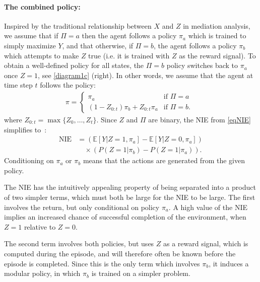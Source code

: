 \documentclass[letterpaper]{article} %
\newcommand{\EE}{\mathbb{E}}
\newcommand{\NIE}{\textrm{NIE}\xspace}
\begin{document}
	\paragraph{The combined policy:}
	Inspired by the traditional relationship between $X$ and $Z$ in mediation analysis, we assume that if $\Pi = a$ then the agent follows a policy $\pi_a$ which is trained to simply maximize $Y$, and that otherwise, if $\Pi = b$, the agent follows a policy $\pi_b$ which attempts to make $Z$ true (i.e. it is trained with $Z$ as the reward signal). To obtain a well-defined policy for all states, the $\Pi=b$ policy switches back to $\pi_a$ once $Z=1$, see \cref{diagram1c} (right). In other words, we assume that the agent at time step $t$ follows the policy:
	\begin{align}
		\pi = \begin{cases} \pi_a & \mbox{if $\Pi = a$ } \\ \left(1-Z_{0:t} \right)\pi_b +Z_{0:t} \pi_a
			& \mbox{if $\Pi = b$. }\end{cases} \label{eq10}
	\end{align}
	where $Z_{0:t} = \max\{Z_0,\dots,Z_t\}$.
	Since $Z$ and $\Pi$ are binary, the \NIE from \cref{eqNIE} simplifies to~\cite{pearl2001direct}:
	\begin{align}
		\NIE & = \left( \EE\left[Y | Z=1, \pi_a \right] - \EE\left[Y | Z=0, \pi_a \right] \right) \nonumber \\
		&\quad  \times  \left( P(Z=1| \pi_b) -P(Z=1| \pi_a) \right).\label{eq12}
	\end{align}
	Conditioning on $\pi_a$ or $\pi_b$ means that the actions are generated from the given policy.

	The \NIE has the intuitively appealing property of being separated into a product of two simpler terms, which must both be large for the \NIE to be large. The first involves the return, but only conditional on policy $\pi_a$. A high value of the \NIE implies an increased chance of successful completion of the environment, when $Z=1$ relative to $Z=0$.

	The second term involves both policies, but uses $Z$ as a reward signal, which is computed during the episode, and will therefore often be known before the episode is completed. Since this is the only term which involves $\pi_b$, it induces a modular policy, in which $\pi_b$ is trained on a simpler problem.%
\end{document}
